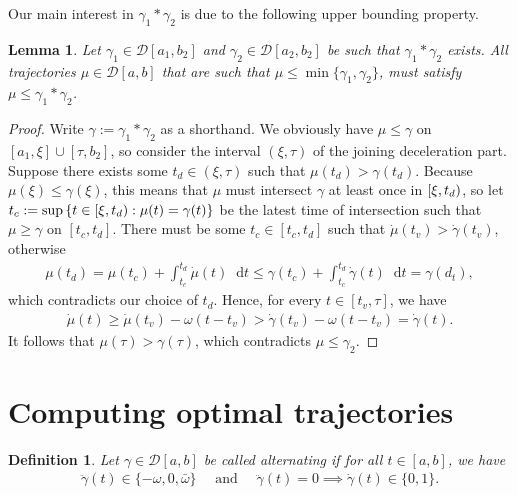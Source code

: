 \documentclass[a4paper]{article}
\theoremstyle{definition}
\theoremstyle{plain}
\newtheorem{define}{Definition\hspace{0.25em}\ignorespaces}
\newtheorem{lemma}{Lemma\hspace{0.25em}\ignorespaces}
\newcommand*\diff{\mathop{}\!\mathrm{d}}
\begin{document}
Our main interest in $\gamma_{1} * \gamma_{2}$ is due to the following upper bounding
property.

\begin{lemma}\label{lemma:upperbound}
  Let $\gamma_{1} \in \mathcal{D}[a_{1}, b_{2}]$ and
  $\gamma_{2} \in \mathcal{D}[a_{2}, b_{2}]$ be such that $\gamma_{1} * \gamma_{2}$ exists. All
  trajectories $\mu \in \mathcal{D}[a, b]$ that are such that
  $\mu \leq \min\{\gamma_{1}, \gamma_{2}\}$, must satisfy $\mu \leq \gamma_{1} * \gamma_{2}$.
\end{lemma}
\begin{proof}
  Write $\gamma := \gamma_{1} * \gamma_{2}$ as a shorthand. We obviously have
  $\mu \leq \gamma$ on $[a_{1}, \xi] \cup [\tau, b_{2}]$, so consider the interval $(\xi, \tau)$ of the joining
  deceleration part. Suppose there exists some $t_{d} \in (\xi, \tau)$ such that
  $\mu(t_{d}) > \gamma(t_{d})$. Because $\mu(\xi) \leq \gamma(\xi)$, this means that $\mu$ must
  intersect $\gamma$ at least once in $[\xi,t_{d})$, so let
  $t_{c} := \sup \, \{ t \in [\xi,t_{d}) : \mu(t) = \gamma(t) \}$ be the latest
  time of intersection such that $\mu \geq \gamma$ on $[t_{c}, t_{d}]$. There must be
  some $t_{c} \in [t_{c}, t_{d}]$ such that $\dot{\mu}(t_{v}) > \dot{\gamma}(t_{v})$, otherwise
  \begin{align*}
    \mu(t_{d}) = \mu(t_{c}) + \int_{t_{c}}^{t_{d}} \dot{\mu}(t) \diff t \leq \gamma(t_{c}) + \int_{t_{c}}^{t_{d}} \dot{\gamma}(t) \diff t = \gamma(d_{t}) ,
  \end{align*}
  which contradicts our choice of $t_{d}$. Hence, for every
  $t \in [t_{v}, \tau]$, we have
  \begin{align*}
    \dot{\mu}(t) \geq \dot{\mu}(t_{v}) - \omega (t - t_{v}) > \dot{\gamma}(t_{v}) - \omega(t - t_{v}) = \dot{\gamma}(t) .
  \end{align*}
  It follows that $\mu(\tau) > \gamma(\tau)$, which contradicts
  $\mu \leq \gamma_{2}$.
\end{proof}


\newpage
\section{Computing optimal trajectories}

\begin{define}
  Let $\gamma \in \mathcal{D}[a, b]$ be called \emph{alternating} if for all $t \in [a, b]$,
  we have
  \begin{align}
    \ddot{\gamma}(t) \in \{-\omega, 0, \bar{\omega}\} \quad \text{ and } \quad
  \ddot{\gamma}(t) = 0 \implies \dot{\gamma}(t) \in \{0, 1\}.
  \end{align}
\end{define}
\end{document}

